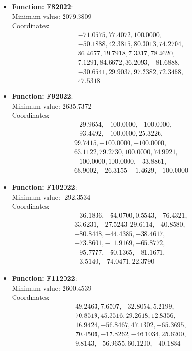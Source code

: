\documentclass{article}
\begin{document}
\begin{itemize}
  \item \textbf{Function: F82022}: \\
    Minimum value: 2079.3809 \\
    Coordinates:
    \[
      \begin{aligned}
        & -71.0575, 77.4072, 100.0000, \\
        & -50.1888, 42.3815, 80.3013, 74.2704, \\
        & 86.4677, 19.7918, 7.3317, 78.4620, \\
        & 7.1291, 84.6672, 36.2093, -81.6888, \\
        & -30.6541, 29.9037, 97.2382, 72.3458, \\
        & 47.5318
      \end{aligned}
    \]

  \item \textbf{Function: F92022}: \\
    Minimum value: 2635.7372 \\
    Coordinates:
    \[
      \begin{aligned}
        & -29.9654, -100.0000, -100.0000, \\
        & -93.4492, -100.0000, 25.3226, \\
        & 99.7415, -100.0000, -100.0000, \\
        & 63.1122, 79.2730, 100.0000, 74.9921, \\
        & -100.0000, 100.0000, -33.8861, \\
        & 68.9002, -26.3155, -1.4629, -100.0000
      \end{aligned}
    \]

  \item \textbf{Function: F102022}: \\
    Minimum value: -292.3534 \\
    Coordinates:
    \[
      \begin{aligned}
        & -36.1836, -64.0700, 0.5543, -76.4321, \\
        & 33.6231, -27.5243, 29.6114, -40.8580, \\
        & -80.8448, -44.4385, -38.4617, \\
        & -73.8601, -11.9169, -65.8772, \\
        & -95.7777, -60.1365, -81.1671, \\
        & -3.5140, -74.0471, 22.3790
      \end{aligned}
    \]

  \item \textbf{Function: F112022}: \\
    Minimum value: 2600.4539 \\
    Coordinates:
    \[
      \begin{aligned}
        & 49.2463, 7.6507, -32.8054, 5.2199, \\
        & 70.8519, 45.3516, 29.2618, 12.8356, \\
        & 16.9424, -56.8467, 47.1302, -65.3695, \\
        & 70.4506, -17.8262, -46.1034, 25.6200, \\
        & 9.8143, -56.9655, 60.1200, -40.1884
      \end{aligned}
    \]


\end{itemize}
\end{document}
